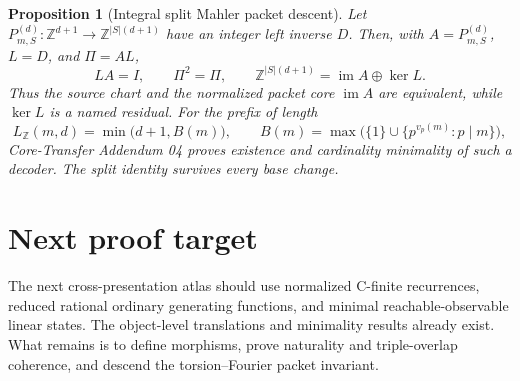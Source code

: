 \documentclass[11pt]{article}
\newtheorem{proposition}[definition]{Proposition}
\begin{document}
\begin{proposition}[Integral split Mahler packet descent]
Let $P_{m,S}^{(d)}:\mathbb Z^{d+1}\to\mathbb Z^{|S|(d+1)}$ have an integer left inverse $D$.  Then, with $A=P_{m,S}^{(d)}$, $L=D$, and $\Pi=AL$,
\[
LA=I,\qquad \Pi^2=\Pi,\qquad
\mathbb Z^{|S|(d+1)}=\operatorname{im}A\oplus\ker L.
\]
Thus the source chart and the normalized packet core $\operatorname{im}A$ are equivalent, while $\ker L$ is a named residual.  For the prefix of length
\[
L_{\mathbb Z}(m,d)=\min\bigl(d+1,B(m)\bigr),
\qquad
B(m)=\max\bigl(\{1\}\cup\{p^{v_p(m)}:p\mid m\}\bigr),
\]
Core-Transfer Addendum 04 proves existence and cardinality minimality of such a decoder.  The split identity survives every base change.
\end{proposition}

\section{Next proof target}
The next cross-presentation atlas should use normalized C-finite recurrences, reduced rational ordinary generating functions, and minimal reachable-observable linear states.  The object-level translations and minimality results already exist.  What remains is to define morphisms, prove naturality and triple-overlap coherence, and descend the torsion--Fourier packet invariant.
\end{document}
